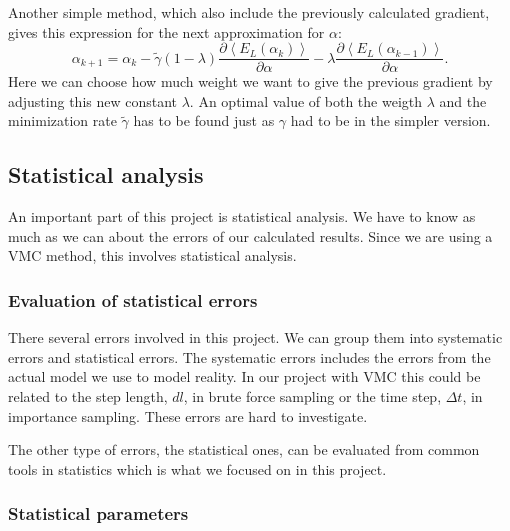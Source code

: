 Another simple method, which also include the previously calculated gradient, gives this expression for the next approximation for $\alpha$:
$$  \alpha_{k+1} =  \alpha_k - \tilde{\gamma} (1-\lambda) \frac{\partial \left<E_L(\alpha_k)\right>}{\partial \alpha} - \lambda \frac{\partial \left<E_L(\alpha_{k-1})\right>}{\partial \alpha}.  $$
Here we can choose how much weight we want to give the previous gradient by adjusting this new constant $\lambda$. An optimal value of both the weigth $\lambda$ and the minimization rate $\tilde{\gamma}$ has to be found just as $\gamma$ had to be in the simpler version.

\subsection{Statistical analysis}

An important part of this project is statistical analysis. We have to know as much as we can about the errors of our calculated results. Since we are using a VMC method, this involves statistical analysis.

\subsubsection{Evaluation of statistical errors}

There several errors involved in this project. We can group them into systematic errors and statistical errors. The systematic errors includes the errors from the actual model we use to model reality. In our project with VMC this could be related to the step length, $dl$, in brute force sampling or the time step, $\Delta t$, in importance sampling. These errors are hard to investigate.

The other type of errors, the statistical ones, can be evaluated from common tools in statistics which is what we focused on in this project.

\subsubsection{Statistical parameters}

